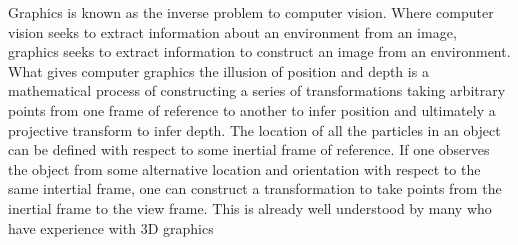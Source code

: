 Graphics is known as the inverse problem to computer vision. Where computer
vision seeks to extract information about an environment from an image,
graphics seeks to extract information to construct an image from an
environment. What gives computer graphics the illusion of position and depth is
a mathematical process of constructing a series of transformations taking
arbitrary points from one frame of reference to another to infer position and
ultimately a projective transform to infer depth. The location of all 
the particles in an object can be defined with respect to some inertial frame
of reference. If one observes the object from some alternative location and
orientation with respect to the same intertial frame, one can construct a 
transformation to take points from the inertial frame to the view frame. This
is already well understood by many who have experience with 3D graphics


